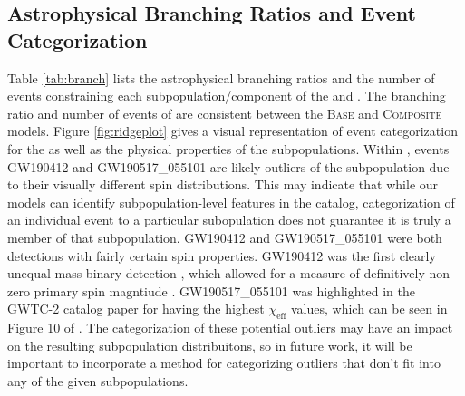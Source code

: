 \subsection{Astrophysical Branching Ratios and Event Categorization}

Table \ref{tab:branch} lists the astrophysical branching ratios and the number of events constraining each subpopulation/component of the \base{} and \comp{}. The branching ratio and number of events of \first{} are consistent between the \textsc{Base} and \textsc{Composite} models. Figure \ref{fig:ridgeplot} gives a visual representation of event categorization for the \comp{} as well as the physical properties of the subpopulations. Within \contA{}, events GW190412 and GW190517\_055101 are likely outliers of the subpopulation due to their visually different spin distributions. This may indicate that while our models can identify subpopulation-level features in the catalog, categorization of an individual event to a particular subopulation does not guarantee it is truly a member of that subpopulation. GW190412 and GW190517\_055101 were both detections with fairly certain spin properties. GW190412 was the first clearly unequal mass binary detection , which allowed for a measure of definitively non-zero primary spin magntiude . GW190517\_055101 was highlighted in the GWTC-2 catalog paper  for having the highest $\chi_\text{eff}$ values, which can be seen in Figure 10 of . The categorization of these potential outliers may have an impact on the resulting subpopulation distribuitons, so in future work, it will be important to incorporate a method for categorizing outliers that don't fit into any of the given subpopulations. 

